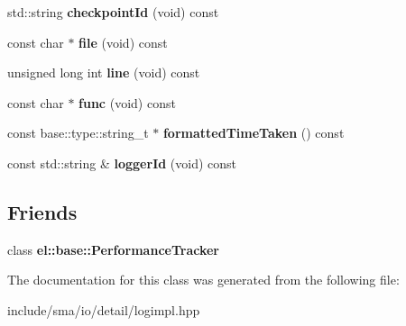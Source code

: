 \begin{DoxyCompactItemize}
\item 
\hypertarget{classel_1_1PerformanceTrackingData_a17c92b7a9ea243eb37f3fa903ce6e06d}{std\-::string {\bfseries checkpoint\-Id} (void) const }\label{classel_1_1PerformanceTrackingData_a17c92b7a9ea243eb37f3fa903ce6e06d}

\item 
\hypertarget{classel_1_1PerformanceTrackingData_a51512448de4eb220514f193a2fc14849}{const char $\ast$ {\bfseries file} (void) const }\label{classel_1_1PerformanceTrackingData_a51512448de4eb220514f193a2fc14849}

\item 
\hypertarget{classel_1_1PerformanceTrackingData_a82529dd8d0c92bf377ec269cb4f69a45}{unsigned long int {\bfseries line} (void) const }\label{classel_1_1PerformanceTrackingData_a82529dd8d0c92bf377ec269cb4f69a45}

\item 
\hypertarget{classel_1_1PerformanceTrackingData_a12fe4fe91e83cbff7d5bb4736176ec30}{const char $\ast$ {\bfseries func} (void) const }\label{classel_1_1PerformanceTrackingData_a12fe4fe91e83cbff7d5bb4736176ec30}

\item 
\hypertarget{classel_1_1PerformanceTrackingData_a44a4c82d400155bd147eb455025c88fc}{const base\-::type\-::string\-\_\-t $\ast$ {\bfseries formatted\-Time\-Taken} () const }\label{classel_1_1PerformanceTrackingData_a44a4c82d400155bd147eb455025c88fc}

\item 
\hypertarget{classel_1_1PerformanceTrackingData_ae8ad846d155762ae7cab3fb67760f5a1}{const std\-::string \& {\bfseries logger\-Id} (void) const }\label{classel_1_1PerformanceTrackingData_ae8ad846d155762ae7cab3fb67760f5a1}

\end{DoxyCompactItemize}
\subsection*{Friends}
\begin{DoxyCompactItemize}
\item 
\hypertarget{classel_1_1PerformanceTrackingData_a6a4d7851e1984800be3c230f06a79528}{class {\bfseries el\-::base\-::\-Performance\-Tracker}}\label{classel_1_1PerformanceTrackingData_a6a4d7851e1984800be3c230f06a79528}

\end{DoxyCompactItemize}


The documentation for this class was generated from the following file\-:\begin{DoxyCompactItemize}
\item 
include/sma/io/detail/logimpl.\-hpp\end{DoxyCompactItemize}
